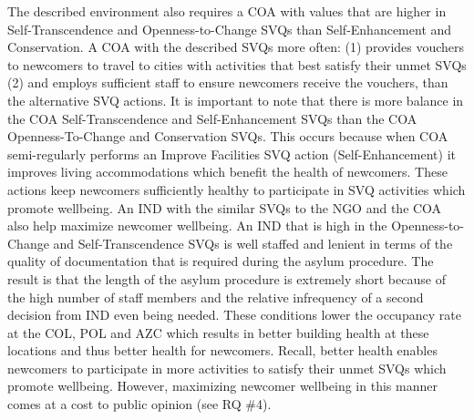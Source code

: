 \documentclass{scspaperproc}
\theoremstyle{scsthe}
\begin{document}
The described environment also requires a COA with values that are higher in Self-Transcendence and Openness-to-Change SVQs than Self-Enhancement and Conservation. A COA with the described SVQs more often: (1) provides vouchers to newcomers to travel to cities with activities that best satisfy their unmet SVQs (2) and employs sufficient staff to ensure newcomers receive the vouchers, than the alternative SVQ actions. It is important to note that there is more balance in the COA Self-Transcendence and Self-Enhancement SVQs than the COA Openness-To-Change and Conservation SVQs. This occurs because when COA semi-regularly performs an Improve Facilities SVQ action (Self-Enhancement) it improves living accommodations which benefit the health of newcomers. These actions keep newcomers sufficiently healthy to participate in SVQ activities which promote wellbeing.  An IND with the similar SVQs to the NGO and the COA also help maximize newcomer wellbeing. An IND that is high in the Openness-to-Change and Self-Transcendence SVQs is well staffed and lenient in terms of the quality of documentation that is required during the asylum procedure. The result is that the length of the asylum procedure is extremely short because of the high number of staff members and the relative infrequency of a second decision from IND even being needed. These conditions lower the occupancy rate at the COL, POL and AZC which results in better building health at these locations and thus better health for newcomers. Recall, better health enables newcomers to participate in more activities to satisfy their unmet SVQs which promote wellbeing. However, maximizing newcomer wellbeing in this manner comes at a cost to public opinion (see RQ \#4). 
\end{document}
